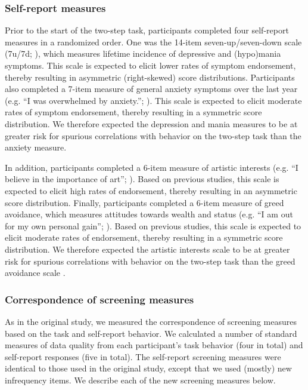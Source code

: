 \documentclass[a4paper,notitlepage,12pt]{article}
\begin{document}
\begin{refsection}[supp]
\subsubsection*{Self-report measures}

Prior to the start of the two-step task, participants completed four self-report measures in a randomized order. One was the 14-item seven-up/seven-down scale (7u/7d; \cite{youngstrom_2013_susd-2}), which measures lifetime incidence of depressive and (hypo)mania symptoms. This scale is expected to elicit lower rates of symptom endorsement, thereby resulting in asymmetric (right-skewed) score distributions. Participants also completed a 7-item measure of general anxiety symptoms over the last year (e.g. ``I was overwhelmed by anxiety.''; \cite{watson2022development}). This scale is expected to elicit moderate rates of symptom endorsement, thereby resulting in a symmetric score distribution. We therefore expected the depression and mania measures to be at greater risk for spurious correlations with behavior on the two-step task than the anxiety measure. 

In addition, participants completed a 6-item measure of artistic interests (e.g. ``I believe in the importance of art''; \cite{ashton2007empirical}). Based on previous studies, this scale is expected to elicit high rates of endorsement, thereby resulting in an asymmetric score distribution. Finally, participants completed a 6-item measure of greed avoidance, which measures attitudes towards wealth and status (e.g. ``I am out for my own personal gain''; \cite{ashton2007empirical}). Based on previous studies, this scale is expected to elicit moderate rates of endorsement, thereby resulting in a symmetric score distribution. We therefore expected the artistic interests scale to be at greater risk for spurious correlations with behavior on the two-step task than the greed avoidance scale . 

\subsubsection*{Correspondence of screening measures}

As in the original study, we measured the correspondence of screening measures based on the task and self-report behavior. We calculated a number of standard measures of data quality from each participant's task behavior (four in total) and self-report responses (five in total). The self-report screening measures were identical to those used in the original study, except that we used (mostly) new infrequency items. We describe each of the new screening measures below.


\end{refsection}
\end{document}
